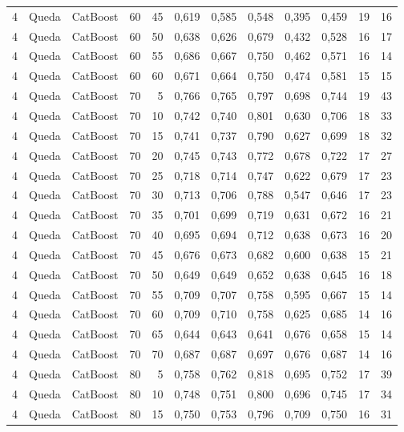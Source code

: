 \begin{longtable}{@{}rllrrrrrrrrr@{}}
4 & Queda & CatBoost & 60 & 45 & 0,619 & 0,585 & 0,548 & 0,395 & 0,459 & 19 & 16 \\
4 & Queda & CatBoost & 60 & 50 & 0,638 & 0,626 & 0,679 & 0,432 & 0,528 & 16 & 17 \\
4 & Queda & CatBoost & 60 & 55 & 0,686 & 0,667 & 0,750 & 0,462 & 0,571 & 16 & 14 \\
4 & Queda & CatBoost & 60 & 60 & 0,671 & 0,664 & 0,750 & 0,474 & 0,581 & 15 & 15 \\
4 & Queda & CatBoost & 70 & 5 & 0,766 & 0,765 & 0,797 & 0,698 & 0,744 & 19 & 43 \\
4 & Queda & CatBoost & 70 & 10 & 0,742 & 0,740 & 0,801 & 0,630 & 0,706 & 18 & 33 \\
4 & Queda & CatBoost & 70 & 15 & 0,741 & 0,737 & 0,790 & 0,627 & 0,699 & 18 & 32 \\
4 & Queda & CatBoost & 70 & 20 & 0,745 & 0,743 & 0,772 & 0,678 & 0,722 & 17 & 27 \\
4 & Queda & CatBoost & 70 & 25 & 0,718 & 0,714 & 0,747 & 0,622 & 0,679 & 17 & 23 \\
4 & Queda & CatBoost & 70 & 30 & 0,713 & 0,706 & 0,788 & 0,547 & 0,646 & 17 & 23 \\
4 & Queda & CatBoost & 70 & 35 & 0,701 & 0,699 & 0,719 & 0,631 & 0,672 & 16 & 21 \\
4 & Queda & CatBoost & 70 & 40 & 0,695 & 0,694 & 0,712 & 0,638 & 0,673 & 16 & 20 \\
4 & Queda & CatBoost & 70 & 45 & 0,676 & 0,673 & 0,682 & 0,600 & 0,638 & 15 & 21 \\
4 & Queda & CatBoost & 70 & 50 & 0,649 & 0,649 & 0,652 & 0,638 & 0,645 & 16 & 18 \\
4 & Queda & CatBoost & 70 & 55 & 0,709 & 0,707 & 0,758 & 0,595 & 0,667 & 15 & 14 \\
4 & Queda & CatBoost & 70 & 60 & 0,709 & 0,710 & 0,758 & 0,625 & 0,685 & 14 & 16 \\
4 & Queda & CatBoost & 70 & 65 & 0,644 & 0,643 & 0,641 & 0,676 & 0,658 & 15 & 14 \\
4 & Queda & CatBoost & 70 & 70 & 0,687 & 0,687 & 0,697 & 0,676 & 0,687 & 14 & 16 \\
4 & Queda & CatBoost & 80 & 5 & 0,758 & 0,762 & 0,818 & 0,695 & 0,752 & 17 & 39 \\
4 & Queda & CatBoost & 80 & 10 & 0,748 & 0,751 & 0,800 & 0,696 & 0,745 & 17 & 34 \\
4 & Queda & CatBoost & 80 & 15 & 0,750 & 0,753 & 0,796 & 0,709 & 0,750 & 16 & 31 \\

\end{longtable}
